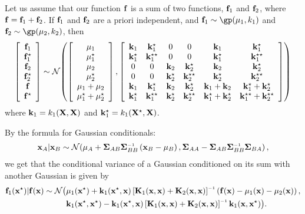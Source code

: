 Let us assume that our function ${\bf{f}}$ is a sum of two functions, ${\bf{f}}_1$ and ${\bf{f}}_2$, where ${\bf{f}} = {\bf{f}}_1 + {\bf{f}}_2$.  If ${\bf{f}}_1$ and ${\bf{f}}_2$ are a priori independent, and $\vf_1 \sim \gp( \vmu_1, k_1)$ and $\vf_2 \sim \gp( \vmu_2, k_2)$, then
\begin{align}
\left[ \begin{array}{c} {\bf{f}}_1 \\ {\bf{f}}_1^\star \\ {\bf{f}}_2 \\ {\bf{f}}_2^\star \\ {\bf{f}} \\ {\bf{f}}^\star \end{array} \right]
\sim
\mathcal{N}\!\left(
\left[ \begin{array}{c} {\bf{\mu}}_1 \\ {\bf{\mu}}_1^\star \\ {\bf{\mu}}_2 \\ {\bf{\mu}}_2^\star \\ {\bf{\mu}}_1 + {\bf{\mu}}_2 \\ {\bf{\mu}}_1^\star + {\bf{\mu}}_2^\star \end{array} \right]
,\left[ \begin{array}{cccccc} 
{\bf{k}}_1 & {\bf{k}}_1^\star & 0 & 0 & {\bf{k}}_1 & {\bf{k}}_1^\star \\ 
{\bf{k}}_1^\star & {\bf{k}}_1^{\star\star} & 0 & 0 & {\bf{k}}_1^\star & {\bf{k}}_1^{\star\star} \\
0 & 0 & {\bf{k}}_2 & {\bf{k}}_2^\star & {\bf{k}}_2 & {\bf{k}}_2^\star \\ 
0 & 0 & {\bf{k}}_2^\star & {\bf{k}}_2^{\star\star} & {\bf{k}}_2^\star & {\bf{k}}_2^{\star\star} \\
{\bf{k}}_1 & {\bf{k}}_1^\star & {\bf{k}}_2 & {\bf{k}}_2^\star & {\bf{k}}_1 + {\bf{k}}_2 & {\bf{k}}_1^\star + {\bf{k}}_2^\star \\ 
{\bf{k}}_1^\star & {\bf{k}}_1^{\star\star}  & {\bf{k}}_2^\star & {\bf{k}}_2^{\star\star}  & {\bf{k}}_1^\star + {\bf{k}}_2^\star & {\bf{k}}_1^{\star\star} + {\bf{k}}_2^{\star\star}\\
\end{array} \right]
\right)
\end{align}
where ${\bf{k}}_1 = k_1( \mathbf{X}, \mathbf{X} )$ and ${\bf{k}}_1^\star = k_1( \mathbf{X}^\star, \mathbf{X} )$. 

By the formula for Gaussian conditionals:
\begin{align}
\vx_A | \vx_B \sim \Nt{\vmu_A + \vSigma_{AB} \vSigma_{BB}\inv \left( \vx_B - \vmu_B \right) }
{\vSigma_{AA} - \vSigma_{AB} \vSigma_{BB}\inv \vSigma_{BA} },
\end{align}
we get that the conditional variance of a Gaussian conditioned on its sum with another Gaussian is given by
\begin{align}
\vf_1(\vx^\star) | \vf(\vx) \sim \mathcal{N}\big( 
& \vmu_1(\vx^\star) + \vk_1(\vx^{\star}, \vx)  \left[ \vK_1(\vx, \vx) + \vK_2(\vx, \vx) \right]\inv \left( \vf(\vx) - \vmu_1(\vx) - \vmu_2(\vx) \right) , \nonumber \\
& \vk_1(\vx^{\star}, \vx^{\star}) - \vk_1(\vx^{\star}, \vx)  \left[ \vK_1(\vx, \vx) + \vK_2(\vx, \vx) \right] \inv \vk_1(\vx, \vx^{\star}) 
\big).
\end{align}

